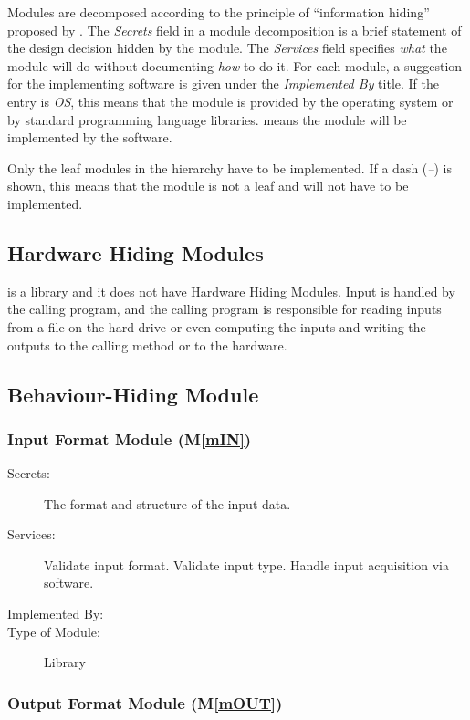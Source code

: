 \documentclass[12pt, titlepage]{article}
\newcommand{\mref}[1]{M\ref{#1}}
\begin{document}
Modules are decomposed according to the principle of ``information hiding''
proposed by \citet{ParnasEtAl1984}. The \emph{Secrets} field in a module
decomposition is a brief statement of the design decision hidden by the
module. The \emph{Services} field specifies \emph{what} the module will do
without documenting \emph{how} to do it. For each module, a suggestion for the
implementing software is given under the \emph{Implemented By} title. If the
entry is \emph{OS}, this means that the module is provided by the operating
system or by standard programming language libraries.  \emph{} means the
module will be implemented by the  software.

Only the leaf modules in the hierarchy have to be implemented. If a dash
(\emph{--}) is shown, this means that the module is not a leaf and will not have
to be implemented.

\subsection{Hardware Hiding Modules}

 is a library and it does not have Hardware Hiding Modules.
Input is handled by the calling program, and the calling program is responsible for
reading inputs from a file on the hard drive or even computing the inputs and writing the outputs
to the calling method or to the hardware.

\subsection{Behaviour-Hiding Module}

\subsubsection{Input Format Module (\mref{mIN})}

\begin{description}
\item[Secrets:] The format and structure of the input data.
\item[Services:] Validate input format. Validate input type. Handle input acquisition via software.
\item[Implemented By:] 
\item[Type of Module:] Library
\end{description}

\subsubsection{Output Format Module (\mref{mOUT})}
\end{document}
